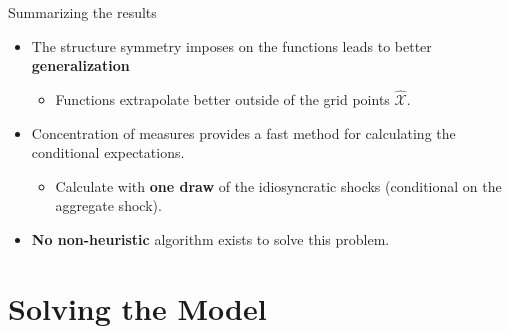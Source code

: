\documentclass[aspectratio=169,10pt]{beamer}
\newcommand{\emphcolor}[1]{\textbf{\textcolor{emphcolorval}{#1}}}
\newcommand{\Xtrain}{\hat{\mathcal{X}}}
\begin{document}
\begin{frame}{Summarizing the results}
	\begin{itemize}
		\item The structure symmetry imposes on the functions leads to better \emphcolor{generalization}\vspace{0.1in}
		\begin{itemize}
			\item Functions extrapolate better outside of the grid points $\Xtrain$.
		\end{itemize} \vspace{0.1in}
		\item Concentration of measures provides a fast method for calculating the conditional expectations. \vspace{0.1in}
		\begin{itemize}
			\item Calculate with \emphcolor{one draw} of the idiosyncratic shocks (conditional on the aggregate shock).\vspace{0.1in}
		\end{itemize} 
	\item \emphcolor{No non-heuristic} algorithm exists to solve this problem.
	\end{itemize}
\end{frame}
		\section{Solving the Model}
	
	
	
	
	
\end{document}
